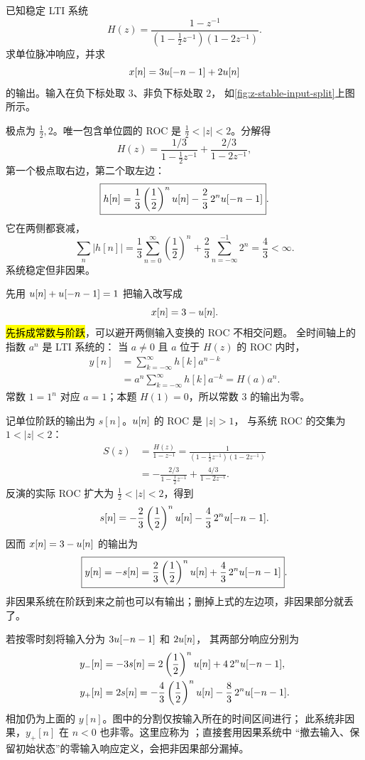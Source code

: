 \begin{example}[稳定的双边系统与分段阶跃输入]
\label{eg:z-stable-two-sided-system}
  已知稳定 LTI 系统
  \[
    H(z)=\frac{1-z^{-1}}
      {(1-\frac12z^{-1})(1-2z^{-1})}.
  \]
  求单位脉冲响应，并求
  \[
    x[n]=3u[-n-1]+2u[n]
  \]
  的输出。输入在负下标处取 $3$、非负下标处取 $2$，
  如\cref{fig:z-stable-input-split}上图所示。

  极点为 $\frac12,2$。唯一包含单位圆的 ROC 是
  $\frac12<|z|<2$。分解得
  \[
    H(z)=\frac{1/3}{1-\frac12z^{-1}}
           +\frac{2/3}{1-2z^{-1}},
  \]
  第一个极点取右边，第二个取左边：
  \[
    \boxed{h[n]=\frac13\left(\frac12\right)^nu[n]
      -\frac23\,2^nu[-n-1]}.
  \]
  它在两侧都衰减，
  \[
    \sum_n|h[n]|=
    \frac13\sum_{n=0}^{\infty}\left(\frac12\right)^n
    +\frac23\sum_{n=-\infty}^{-1}2^n
    =\frac43<\infty.
  \]
  系统稳定但非因果。

  先用 $u[n]+u[-n-1]=1$ 把输入改写成
  \[
    x[n]=3-u[n].
  \]
  \hl{先拆成常数与阶跃}，可以避开两侧输入变换的 ROC 不相交问题。
  全时间轴上的指数 $a^n$ 是 LTI 系统的：
  当 $a\ne0$ 且 $a$ 位于 $H(z)$ 的 ROC 内时，
  \begin{align*}
    y[n]&=\sum_{k=-\infty}^{\infty}h[k]a^{n-k}\\
      &=a^n\sum_{k=-\infty}^{\infty}h[k]a^{-k}
       =H(a)a^n.
  \end{align*}
  常数 $1=1^n$ 对应 $a=1$；本题 $H(1)=0$，所以常数 $3$ 的输出为零。

  记单位阶跃的输出为 $s[n]$。$u[n]$ 的 ROC 是 $|z|>1$，
  与系统 ROC 的交集为 $1<|z|<2$：
  \begin{align*}
    S(z)&=\frac{H(z)}{1-z^{-1}}
      =\frac1{(1-\frac12z^{-1})(1-2z^{-1})}\\
      &=-\frac{2/3}{1-\frac12z^{-1}}
             +\frac{4/3}{1-2z^{-1}}.
  \end{align*}
  反演的实际 ROC 扩大为 $\frac12<|z|<2$，得到
  \[
    s[n]=-\frac23\left(\frac12\right)^nu[n]
           -\frac43\,2^nu[-n-1].
  \]
  因而 $x[n]=3-u[n]$ 的输出为
  \[
    \boxed{y[n]=-s[n]
      =\frac23\left(\frac12\right)^nu[n]
         +\frac43\,2^nu[-n-1]}.
  \]
  非因果系统在阶跃到来之前也可以有输出；删掉上式的左边项，非因果部分就丢了。

  若按零时刻将输入分为 $3u[-n-1]$ 和 $2u[n]$，
  其两部分响应分别为
  \begin{align*}
    y_-[n]&=-3s[n]
       =2\left(\frac12\right)^nu[n]
          +4\,2^nu[-n-1],\\
    y_+[n]&=2s[n]
       =-\frac43\left(\frac12\right)^nu[n]
          -\frac83\,2^nu[-n-1].
  \end{align*}
  相加仍为上面的 $y[n]$。图中的分割仅按输入所在的时间区间进行；
  此系统非因果，$y_+[n]$ 在 $n<0$ 也非零。这里应称为
  ；直接套用因果系统中
  “撤去输入、保留初始状态”的零输入响应定义，会把非因果部分漏掉。
\end{example}

